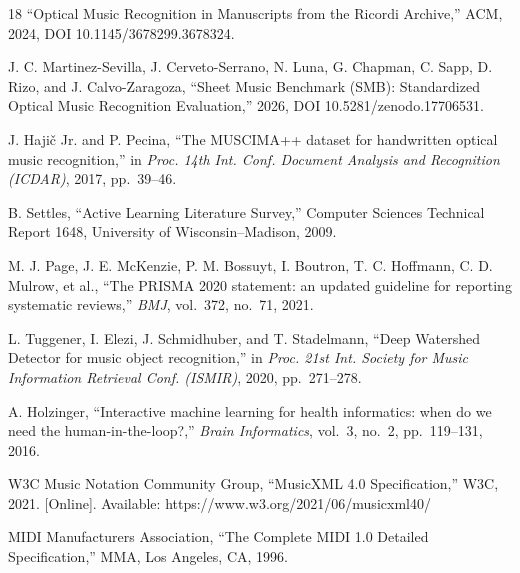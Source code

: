 \begin{thebibliography}{18}
``Optical Music Recognition in Manuscripts from the Ricordi Archive,''
ACM, 2024, DOI 10.1145/3678299.3678324. %

J. C. Martinez-Sevilla, J. Cerveto-Serrano, N. Luna, G. Chapman, C. Sapp,
D. Rizo, and J. Calvo-Zaragoza, ``Sheet Music Benchmark (SMB): Standardized
Optical Music Recognition Evaluation,'' 2026, DOI 10.5281/zenodo.17706531.

J. Haji\v{c} Jr. and P. Pecina, ``The MUSCIMA++ dataset for handwritten
optical music recognition,'' in \emph{Proc. 14th Int. Conf. Document
Analysis and Recognition (ICDAR)}, 2017, pp.~39--46. %

B. Settles, ``Active Learning Literature Survey,'' Computer Sciences
Technical Report 1648, University of Wisconsin--Madison, 2009. %

M. J. Page, J. E. McKenzie, P. M. Bossuyt, I. Boutron, T. C. Hoffmann,
C. D. Mulrow, et al., ``The PRISMA 2020 statement: an updated guideline
for reporting systematic reviews,'' \emph{BMJ}, vol.~372, no.~71, 2021.

L. Tuggener, I. Elezi, J. Schmidhuber, and T. Stadelmann, ``Deep Watershed
Detector for music object recognition,'' in \emph{Proc. 21st Int. Society for
Music Information Retrieval Conf. (ISMIR)}, 2020, pp.~271--278. %

A. Holzinger, ``Interactive machine learning for health informatics: when do
we need the human-in-the-loop?,'' \emph{Brain Informatics}, vol.~3, no.~2,
pp.~119--131, 2016. %

W3C Music Notation Community Group, ``MusicXML 4.0 Specification,'' W3C, 2021.
[Online]. Available: https://www.w3.org/2021/06/musicxml40/ %

MIDI Manufacturers Association, ``The Complete MIDI 1.0 Detailed Specification,''
MMA, Los Angeles, CA, 1996. %

\end{thebibliography}

